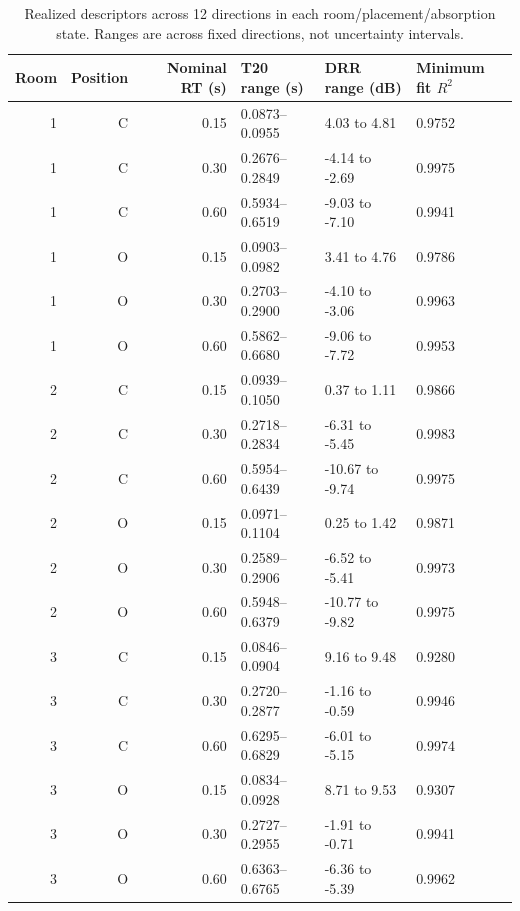 \begin{table}[htbp]\centering\small
\caption{Realized descriptors across 12 directions in each room/placement/absorption state. Ranges are across fixed directions, not uncertainty intervals.}
\begin{tabular}{@{}rrrlll@{}}\toprule
Room & Position & Nominal RT (s) & T20 range (s) & DRR range (dB) & Minimum fit $R^2$\\\midrule
1 & C & 0.15 & 0.0873--0.0955 & 4.03 to 4.81 & 0.9752\\
1 & C & 0.30 & 0.2676--0.2849 & -4.14 to -2.69 & 0.9975\\
1 & C & 0.60 & 0.5934--0.6519 & -9.03 to -7.10 & 0.9941\\
1 & O & 0.15 & 0.0903--0.0982 & 3.41 to 4.76 & 0.9786\\
1 & O & 0.30 & 0.2703--0.2900 & -4.10 to -3.06 & 0.9963\\
1 & O & 0.60 & 0.5862--0.6680 & -9.06 to -7.72 & 0.9953\\
2 & C & 0.15 & 0.0939--0.1050 & 0.37 to 1.11 & 0.9866\\
2 & C & 0.30 & 0.2718--0.2834 & -6.31 to -5.45 & 0.9983\\
2 & C & 0.60 & 0.5954--0.6439 & -10.67 to -9.74 & 0.9975\\
2 & O & 0.15 & 0.0971--0.1104 & 0.25 to 1.42 & 0.9871\\
2 & O & 0.30 & 0.2589--0.2906 & -6.52 to -5.41 & 0.9973\\
2 & O & 0.60 & 0.5948--0.6379 & -10.77 to -9.82 & 0.9975\\
3 & C & 0.15 & 0.0846--0.0904 & 9.16 to 9.48 & 0.9280\\
3 & C & 0.30 & 0.2720--0.2877 & -1.16 to -0.59 & 0.9946\\
3 & C & 0.60 & 0.6295--0.6829 & -6.01 to -5.15 & 0.9974\\
3 & O & 0.15 & 0.0834--0.0928 & 8.71 to 9.53 & 0.9307\\
3 & O & 0.30 & 0.2727--0.2955 & -1.91 to -0.71 & 0.9941\\
3 & O & 0.60 & 0.6363--0.6765 & -6.36 to -5.39 & 0.9962\\
\bottomrule\end{tabular}\end{table}
